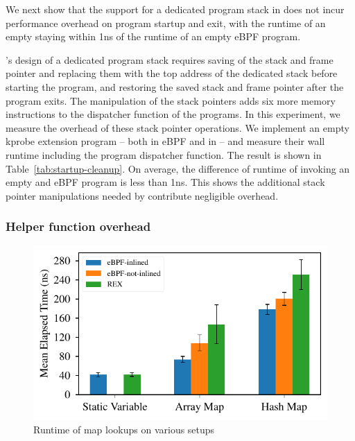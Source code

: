 We next show that the support for a dedicated program stack in \projname{} does
    not incur performance overhead on program startup and exit, with the
    runtime of an empty \projname{} staying within 1ns of the runtime of an
    empty eBPF program.

\projname{}'s design of a dedicated program stack requires saving of the stack
    and frame pointer and replacing them
    with the top address of the dedicated stack before starting the program,
    and restoring the saved stack and frame pointer after the program exits.
The manipulation of the stack pointers adds six more memory instructions to
    the dispatcher function of the \projname{} programs.
In this experiment, we measure the overhead of these stack pointer operations.
We implement an empty kprobe extension program -- both in eBPF and in
    \projname{} -- and measure their wall runtime including the program
    dispatcher function.
The result is shown in Table~\ref{tab:startup-cleanup}.
On average, the difference of runtime of invoking an empty \projname{} and eBPF
    program is less than 1ns.
This shows the additional stack pointer manipulations needed by \projname{}
    contribute negligible overhead.

\subsubsection{Helper function overhead}
\label{eval:inline}

\begin{figure}[t]
    \includegraphics[width=1.0\linewidth]{figs/inline.pdf}
    \centering
    \vspace{-25pt}
    \caption{Runtime of map lookups on various setups}
    \label{fig:eval-inline}
    \vspace{-12pt}
\end{figure}

